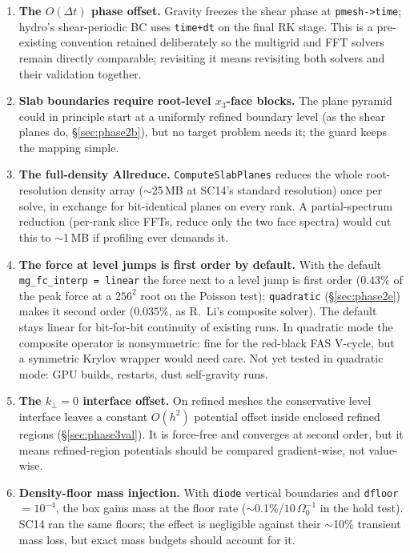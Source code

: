 \documentclass[11pt]{article}
\newcommand{\code}[1]{\texttt{#1}}
\newcommand{\fn}[1]{\texttt{\small #1}}
\newcommand{\Om}{\Omega_0}
\begin{document}
\begin{enumerate}
\item \textbf{The $O(\Delta t)$ phase offset.} Gravity freezes the shear phase at
      \code{pmesh->time}; hydro's shear-periodic BC uses \code{time+dt} on the final
      RK stage. This is a pre-existing convention retained deliberately so the
      multigrid and FFT solvers remain directly comparable; revisiting it means
      revisiting both solvers and their validation together.

\item \textbf{Slab boundaries require root-level $x_3$-face blocks.} The plane
      pyramid could in principle start at a uniformly refined boundary level (as the
      shear planes do, \S\ref{sec:phase2b}), but no target problem needs it; the
      guard keeps the mapping simple.

\item \textbf{The full-density Allreduce.} \fn{ComputeSlabPlanes} reduces the whole
      root-resolution density array ($\sim$25\,MB at SC14's standard resolution) once
      per solve, in exchange for bit-identical planes on every rank. A
      partial-spectrum reduction (per-rank slice FFTs, reduce only the two face
      spectra) would cut this to $\sim$1\,MB if profiling ever demands it.

\item \textbf{The force at level jumps is first order by default.} With the default
      \code{mg\_fc\_interp = linear} the force next to a level jump is first order ($0.43\%$ of
      the peak force at a $256^2$ root on the Poisson test); \code{quadratic}
      (\S\ref{sec:phase2e}) makes it second order ($0.035\%$, as R.~Li's composite solver).
      The default stays linear for bit-for-bit continuity of existing runs. In quadratic mode the
      composite operator is nonsymmetric: fine for the red-black FAS V-cycle, but a symmetric
      Krylov wrapper would need care. Not yet tested in quadratic mode: GPU builds, restarts,
      dust self-gravity runs.

\item \textbf{The $k_\perp = 0$ interface offset.} On refined meshes the conservative
      level interface leaves a constant $O(h^2)$ potential offset inside enclosed
      refined regions (\S\ref{sec:phase3val}). It is force-free and converges at
      second order, but it means refined-region potentials should be compared
      gradient-wise, not value-wise.

\item \textbf{Density-floor mass injection.} With \code{diode} vertical boundaries
      and \code{dfloor} $= 10^{-4}$, the box gains mass at the floor rate
      ($\sim$0.1\%/$10\,\Om^{-1}$ in the hold test). SC14 ran the same floors; the
      effect is negligible against their $\sim$10\% transient mass loss, but exact
      mass budgets should account for it.
\end{enumerate}
\end{document}
